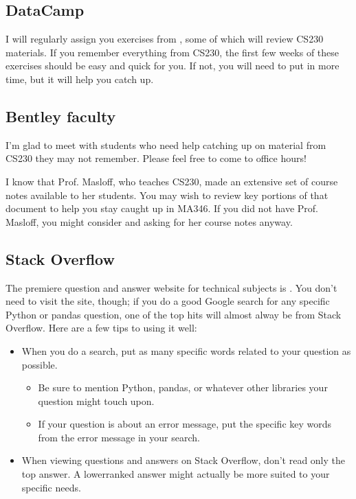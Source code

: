 \documentclass[letterpaper,10pt,english]{jupyterBook}
\begin{document}
\subsection{DataCamp}
\label{\detokenize{chapter-4-review-of-python-and-pandas:datacamp}}
\sphinxAtStartPar
I will regularly assign you exercises from , some of which will review CS230 materials.  If you remember everything from CS230, the first few weeks of these exercises should be easy and quick for you.  If not, you will need to put in more time, but it will help you catch up.


\subsection{Bentley faculty}
\label{\detokenize{chapter-4-review-of-python-and-pandas:bentley-faculty}}
\sphinxAtStartPar
I’m glad to meet with students who need help catching up on material from CS230 they may not remember.  Please feel free to come to office hours!

\sphinxAtStartPar
I know that Prof. Masloff, who teaches CS230, made an extensive set of course notes available to her students.  You may wish to review key portions of that document to help you stay caught up in MA346.  If you did not have Prof. Masloff, you might consider  and asking for her course notes anyway.


\subsection{Stack Overflow}
\label{\detokenize{chapter-4-review-of-python-and-pandas:stack-overflow}}
\sphinxAtStartPar
The premiere question and answer website for technical subjects is .  You don’t need to visit the site, though; if you do a good Google search for any specific Python or pandas question, one of the top hits will almost alway be from Stack Overflow.  Here are a few tips to using it well:
\begin{itemize}
\item {} 
\sphinxAtStartPar
When you do a search, put as many specific words related to your question as possible.
\begin{itemize}
\item {} 
\sphinxAtStartPar
Be sure to mention Python, pandas, or whatever other libraries your question might touch upon.

\item {} 
\sphinxAtStartPar
If your question is about an error message, put the specific key words from the error message in your search.

\end{itemize}

\item {} 
\sphinxAtStartPar
When viewing questions and answers on Stack Overflow, don’t read only the top answer.  A lower\sphinxhyphen{}ranked answer might actually be more suited to your specific needs.

\end{itemize}
\end{document}
